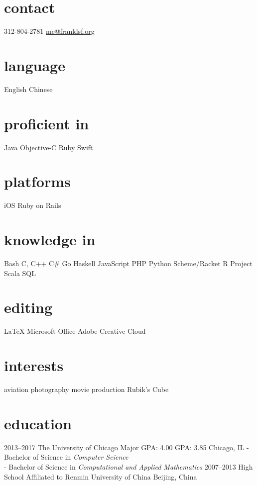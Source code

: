 



\begin{aside} %
\section{contact}
312-804-2781
\underline{me@franklsf.org}
\section{language}
English
Chinese
\section{proficient in}
Java
Objective-C
Ruby
Swift
\section{platforms}
iOS
Ruby on Rails
\section{knowledge in}
Bash
C, C++
C\#
Go
Haskell
JavaScript
PHP
Python
Scheme/Racket
R Project
Scala
SQL
\section{editing}
{\LaTeX}
Microsoft Office
Adobe Creative Cloud
\section{interests}
aviation
photography
movie production
Rubik’s Cube
\end{aside}

\section{education}

\begin{entrylist}
\entry
{2013--2017}
{The University of Chicago}
{Major GPA: 4.00\hspace{2em} GPA: 3.85\hspace{2em} Chicago, IL}
{- Bachelor of Science in \emph{Computer Science} \\
 - Bachelor of Science in \emph{Computational and Applied Mathematics}}
\entry
{2007--2013}
{High School Affiliated to Renmin University of China}
{Beijing, China}
{}
\end{entrylist}

